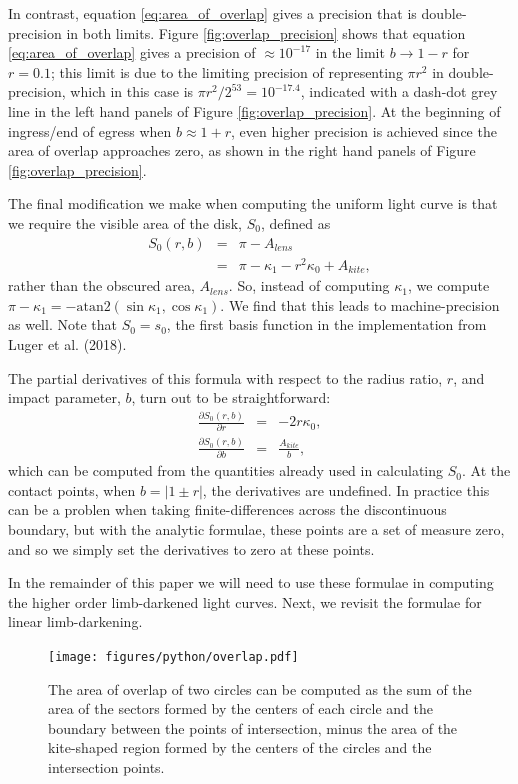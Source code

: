 \documentclass[modern]{aastex61}
\begin{document}
In contrast, equation \ref{eq:area_of_overlap} gives a precision
that is double-precision in both limits.  Figure
\ref{fig:overlap_precision} shows that equation \ref{eq:area_of_overlap}
gives a precision of $\approx 10^{-17}$ in the limit $b \rightarrow
1-r$ for $r=0.1$; this limit is due to the limiting precision of
representing $\pi r^2$ in double-precision, which in this case
is $\pi r^2 / 2^{53} = 10^{-17.4}$, indicated with a dash-dot
grey line in the left hand panels of Figure \ref{fig:overlap_precision}.
At the beginning of ingress/end of egress when $b \approx 1+r$,
even higher precision is achieved since the area of overlap approaches
zero, as shown in the right hand panels of Figure \ref{fig:overlap_precision}.

The final modification we make when computing the uniform light
curve is that we require the visible area of the disk, $S_0$, defined as
\begin{eqnarray} \label{eq:uniform}
S_0(r,b) &=& \pi-A_{lens}\\
&=&\pi -\kappa_1 - r^2\kappa_0 + A_{kite},
\end{eqnarray}
rather than the obscured area, $A_{lens}$.  So, instead of computing $\kappa_1$,
we compute $\pi-\kappa_1 = -\mathrm{atan2}(\sin{\kappa_1},\cos{\kappa_1})$.
We find that this leads to machine-precision as well.  Note that $S_0=s_0$,
the first basis function in the \starry implementation from Luger et al. (2018).

The partial derivatives of this formula with respect to the radius
ratio, $r$, and impact parameter, $b$, turn out to be straightforward:
\begin{eqnarray}\label{eq:dS0_drb}
\frac{\partial S_0(r,b)}{\partial r} &=& -2r \kappa_0,\\
\frac{\partial S_0(r,b)}{\partial b} &=& \frac{A_{kite}}{b},
\end{eqnarray}
which can be computed from the quantities already used in calculating $S_0$.
At the contact points, when $b = \vert 1\pm r\vert$, the derivatives are undefined.
In practice this can be a problen when taking finite-differences across
the discontinuous boundary, but with the analytic formulae, these points
are a set of measure zero, and so we simply set the derivatives to zero
at these points.

In the remainder of this paper we will need to use these formulae in computing
the higher order limb-darkened light curves.  Next, we revisit the formulae
for linear limb-darkening.

\begin{figure}
    \begin{centering}
    \texttt{[image: figures/python/overlap.pdf]}
    \caption{The area of overlap of two circles can be computed as the sum of
    the area of the sectors formed by the centers of each circle and the
    boundary between the points of intersection, minus the area of the kite-shaped
    region formed by the centers of the circles and the intersection points.
    }\label{fig:circle_overlap}
    \end{centering}
\end{figure}
\end{document}
